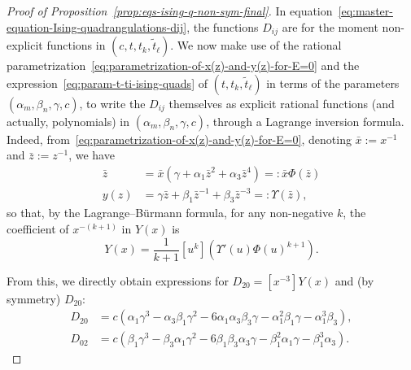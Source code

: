 \documentclass{scrartcl}
\newcommand\wt[1]{\widetilde{#1}}
\begin{document}
\begin{proof}[Proof of Proposition~\ref{prop:eqs-ising-q-non-sym-final}]
In equation~\eqref{eq:master-equation-Ising-quadrangulations-dij}, the functions $D_{ij}$ are for the moment non-explicit functions in $(c,t, t_k, \wt{t}_\ell)$. We now make use of the rational parametrization~\eqref{eq:parametrization-of-x(z)-and-y(z)-for-E=0} and the expression~\eqref{eq:param-t-ti-ising-quads} of $(t, t_k, \wt{t}_\ell)$ in terms of the parameters $(\alpha_m,\beta_n, \gamma, c)$, to write the $D_{ij}$ themselves as explicit rational functions (and actually, polynomials) in $(\alpha_m,\beta_n, \gamma, c)$, through a Lagrange inversion formula. Indeed, from~\eqref{eq:parametrization-of-x(z)-and-y(z)-for-E=0}, denoting $\bar{x}:=x^{-1}$ and $\bar{z}:=z^{-1}$, we have
\begin{equation}
\begin{aligned}
\bar{z} &=\bar{x}\left(\gamma+\alpha_1\bar{z}^2+\alpha_3\bar{z}^4\right)=:\bar{x}\Phi(\bar{z})\\
y(z) &=\gamma\bar{z}+\beta_1\bar{z}^{-1}+\beta_3\bar{z}^{-3}=:\Upsilon(\bar{z}),
\end{aligned}
\end{equation}
so that, by the Lagrange--Bürmann formula, for any non-negative $k$, the coefficient of ${x}^{-(k+1)}$ in $Y(x)$ is
\begin{equation}
[\bar{x}^{k+1}]Y(x)=\frac{1}{k+1}[u^k]\left(\Upsilon'(u)\Phi(u)^{k+1}\right).
\label{eq:lagrange-inv-x-z}
\end{equation}

From this, we directly obtain expressions for $D_{20}=[x^{-3}]Y(x)$ and (by symmetry) $D_{20}$:
\begin{equation}
\begin{aligned}
D_{20}&=c\left(\alpha_1\gamma^3-\alpha_3\beta_1\gamma^2-6\alpha_1\alpha_3\beta_3\gamma-\alpha_1^2\beta_1\gamma-\alpha_1^3\beta_3\right),\\
D_{02}&=c\left(\beta_1\gamma^3-\beta_3\alpha_1\gamma^2-6\beta_1\beta_3\alpha_3\gamma-\beta_1^2\alpha_1\gamma-\beta_1^3\alpha_3\right).
\end{aligned}
\label{eq:M02-M20-param-ratio}
\end{equation}


\end{proof}
\end{document}
